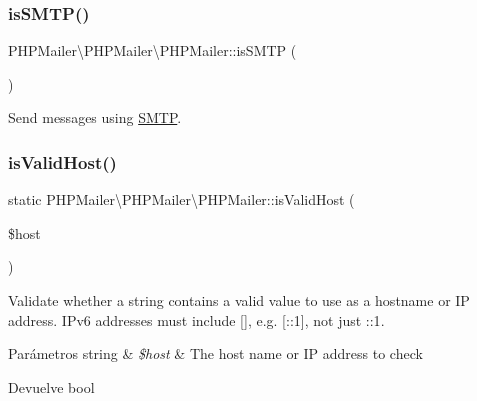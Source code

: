 \subsubsection{\texorpdfstring{is\+S\+M\+T\+P()}{isSMTP()}}
{\footnotesize\ttfamily P\+H\+P\+Mailer\textbackslash{}\+P\+H\+P\+Mailer\textbackslash{}\+P\+H\+P\+Mailer\+::is\+S\+M\+TP (\begin{DoxyParamCaption}{ }\end{DoxyParamCaption})}

Send messages using \hyperlink{classPHPMailer_1_1PHPMailer_1_1SMTP}{S\+M\+TP}. \mbox{\label{classPHPMailer_1_1PHPMailer_1_1PHPMailer_a9396e56991c20b230e9f7a7fb54db64b}} 
\subsubsection{\texorpdfstring{is\+Valid\+Host()}{isValidHost()}}
{\footnotesize\ttfamily static P\+H\+P\+Mailer\textbackslash{}\+P\+H\+P\+Mailer\textbackslash{}\+P\+H\+P\+Mailer\+::is\+Valid\+Host (\begin{DoxyParamCaption}\item[{}]{\$host }\end{DoxyParamCaption})\hspace{0.3cm}{\ttfamily [static]}}

Validate whether a string contains a valid value to use as a hostname or IP address. I\+Pv6 addresses must include \mbox{[}\mbox{]}, e.\+g. {\ttfamily \mbox{[}\+:\+:1\mbox{]}}, not just {\ttfamily \+:\+:1}.


\begin{DoxyParams}[1]{Parámetros}
string & {\em \$host} & The host name or IP address to check\\
\hline
\end{DoxyParams}
\begin{DoxyReturn}{Devuelve}
bool 
\end{DoxyReturn}
\mbox{\label{classPHPMailer_1_1PHPMailer_1_1PHPMailer_a3acee11d1ea952f5926356da4cd01aa1}} 
